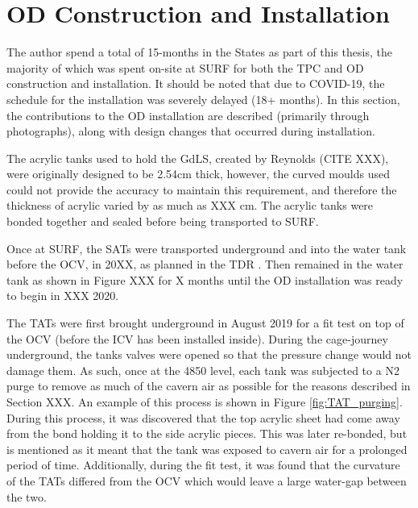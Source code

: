 \section{OD Construction and Installation} \label{od_construction_sec}

\par
The author spend a total of 15-months in the States as part of this thesis, the majority of which was spent on-site at SURF for both the TPC and OD construction and installation.
It should be noted that due to COVID-19, the schedule for the installation was severely delayed (18+ months).
In this section, the contributions to the OD installation are described (primarily through photographs), along with design changes that occurred during installation.

\par
The acrylic tanks used to hold the GdLS, created by Reynolds (CITE XXX), were originally designed to be 2.54cm thick, however, the curved moulds used could not provide the accuracy to maintain this requirement, and therefore the thickness of acrylic varied by as much as XXX cm.
The acrylic tanks were bonded together and sealed before being transported to SURF.

\par
Once at SURF, the SATs were transported underground and into the water tank before the OCV, in 20XX, as planned in the TDR \cite{LZ_TechnicalDesignReview_ref}.
Then remained in the water tank as shown in Figure XXX for X months until the OD installation was ready to begin in XXX 2020. 


\par
The TATs were first brought underground in August 2019 for a fit test on top of the OCV (before the ICV has been installed inside).
During the cage-journey underground, the tanks valves were opened so that the pressure change would not damage them.
As such, once at the 4850 level, each tank was subjected to a N2 purge to remove as much of the cavern air as possible for the reasons described in Section XXX.
An example of this process is shown in Figure \ref{fig:TAT_purging}.
During this process, it was discovered that the top acrylic sheet had come away from the bond holding it to the side acrylic pieces.
This was later re-bonded, but is mentioned as it meant that the tank was exposed to cavern air for a prolonged period of time.
Additionally, during the fit test, it was found that the curvature of the TATs differed from the OCV which would leave a large water-gap between the two.

